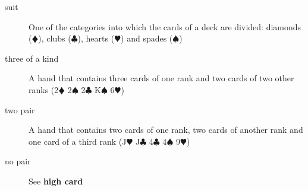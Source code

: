\documentclass{article}
\begin{document}
\begin{description}
 \item[suit] One of the categories into which the cards of a deck are divided: diamonds ($\vardiamond$), clubs ($\clubsuit$), hearts ($\varheart$) and spades ($\spadesuit$)
 \item[three of a kind] A hand that contains three cards of one rank and two cards of two other ranks (2$\vardiamond$ 2$\spadesuit$ 2$\clubsuit$ K$\spadesuit$ 6$\varheart$)
 \item[two pair] A hand that contains two cards of one rank, two cards of another rank and one card of a third rank (J$\varheart$ J$\clubsuit$ 4$\clubsuit$ 4$\spadesuit$ 9$\varheart$)
 \item[no pair] See \textbf{high card}
\end{description}
\end{document}
